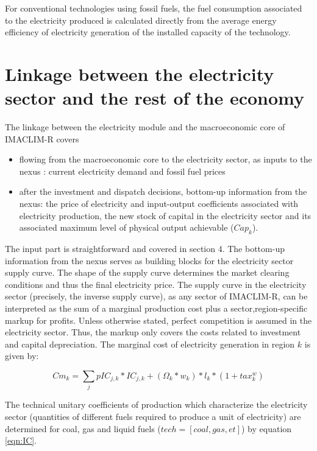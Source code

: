 For conventional technologies using fossil fuels, the fuel consumption associated to the electricity produced is calculated directly from the average energy efficiency of electricity generation of the installed capacity of the technology.

\section{Linkage between the electricity sector and the rest of the economy}

The linkage between the electricity module and the macroeconomic core of IMACLIM-R covers
\begin{itemize}
    \item flowing from the macroeconomic core to the electricity sector, as inputs to the nexus : current electricity demand and fossil fuel prices
    \item after the investment and dispatch decisions, bottom-up information from the nexus: the price of electricity and input-output coefficients associated with electricity production, the new stock of capital in the electricity sector and its associated maximum level of physical output achievable ($Cap_{k}$).
\end{itemize}

The input part is straightforward and covered in section 4. The bottom-up information from the nexus serves as building blocks for the electricity sector supply curve. The shape of the supply curve determines the market clearing conditions and thus the final electricity price. The supply curve in the electricity sector (precisely, the inverse supply curve), as any sector of IMACLIM-R, can be interpreted as the sum of a marginal production cost plus a sector,region-specific markup for profits. Unless otherwise stated, perfect competition is assumed in the electricity sector. Thus, the markup only covers the costs related to investment and capital depreciation.
The marginal cost of electricity generation in region $k$ is given by:

\begin{dmath}
    Cm_{k} = \sum_{j}{}pIC_{j,k}*IC_{j,k} + (\Omega_{k}*w_{k})*l_{k}*(1+tax_{k}^{w})
    \label{eqn:Cm}
\end{dmath}


The technical unitary coefficients of production which characterize the electricity sector (quantities of different fuels required to produce a unit of electricity) are determined for coal, gas and liquid fuels ($tech = [coal,gas,et]$) by equation \ref{eqn:IC}.

